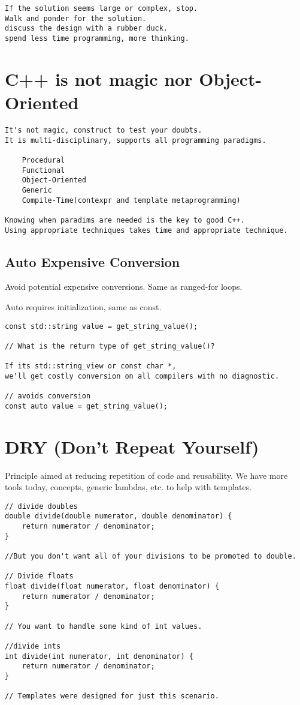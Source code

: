 \begin{verbatim}
If the solution seems large or complex, stop. 
Walk and ponder for the solution. 
discuss the design with a rubber duck. 
spend less time programming, more thinking.
\end{verbatim}

\section{C++ is not magic nor Object-Oriented}

\begin{verbatim}
It's not magic, construct to test your doubts.
It is multi-disciplinary, supports all programming paradigms.

    Procedural
    Functional
    Object-Oriented
    Generic
    Compile-Time(contexpr and template metaprogramming)

Knowing when paradims are needed is the key to good C++.
Using appropriate techniques takes time and appropriate technique. 
\end{verbatim}

\subsection{Auto Expensive Conversion}

Avoid potential expensive conversions. Same as ranged-for loops. 

Auto requires initialization, same as const. 

\begin{verbatim}
const std::string value = get_string_value();

// What is the return type of get_string_value()? 

If its std::string_view or const char *,
we'll get costly conversion on all compilers with no diagnostic. 

// avoids conversion
const auto value = get_string_value();
\end{verbatim}

\section{DRY (Don't Repeat Yourself)}

Principle aimed at reducing repetition of code and reusability. 
We have more tools today, concepts, generic lambdas, etc. to help with templates.

\begin{verbatim}
// divide doubles
double divide(double numerator, double denominator) {
    return numerator / denominator;
}

//But you don't want all of your divisions to be promoted to double. 

// Divide floats
float divide(float numerator, float denominator) {
    return numerator / denominator;
}

// You want to handle some kind of int values. 

//divide ints
int divide(int numerator, int denominator) {
    return numerator / denominator;
}

// Templates were designed for just this scenario. 
\end{verbatim}

